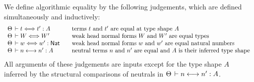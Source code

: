 \documentclass[acmlarge,review,anonymous]{acmart}\settopmatter{printfolios=true}
\begin{document}
We define algorithmic equality by the following judgements, which are defined simultaneously and inductively:
\[
\begin{array}{l@{\qquad}l}
  \The \der t \eqchk t' : A & \mbox{terms $t$ and $t'$ are equal at type shape $A$} \\
  \The \der W \eqchk W'         & \mbox{weak head normal forms $W$ and $W'$ are equal types} \\
  \The \der w \eqchk w' : \tNat & \mbox{weak head normal forms $w$ and $w'$ are equal natural numbers} \\
  \The \der n \eqinf n' : A     & \mbox{neutral terms $n$ and $n'$ are equal and $A$ is their inferred type shape} \\
\end{array}
\]
All arguments of these judgements are inputs except for the type shape $A$ inferred by the structural comparisons of neutrals in $\Theta \,\vdash n \mathrel{\longleftrightarrow} n' : A$.
\end{document}
